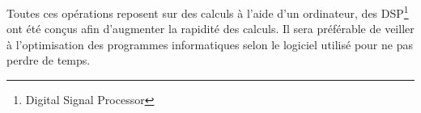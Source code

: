 \documentclass[french]{article}
\begin{document}
Toutes ces opérations reposent sur des calculs à l'aide d'un ordinateur, des DSP\footnote{Digital Signal Processor} ont été conçus afin d'augmenter la rapidité des calculs. Il sera préférable de veiller à l'optimisation des programmes informatiques selon le logiciel utilisé pour ne pas perdre de temps.
\end{document}
